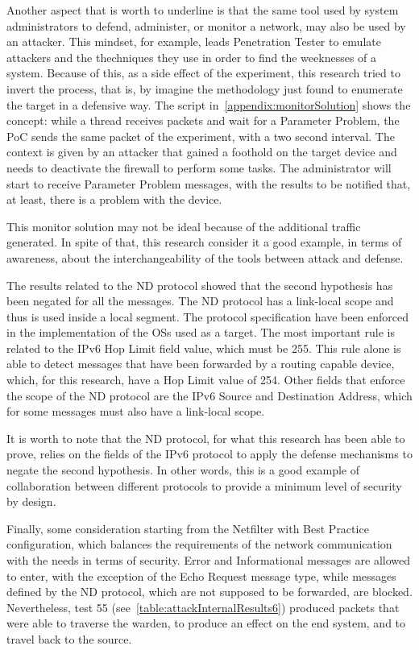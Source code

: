 \documentclass[12pt]{article}
\begin{document}
Another aspect that is worth to underline is that the same tool used by system administrators to defend, administer, or monitor a network, may also be used by an attacker. This mindset, for example, leads Penetration Tester to emulate attackers and the thechniques they use in order to find the weeknesses of a system. Because of this, as a side effect of the experiment, this research tried to invert the process, that is, by imagine the methodology just found to enumerate the target in a defensive way. The script in~\cref{appendix:monitorSolution} shows the concept: while a thread receives packets and wait for a Parameter Problem,  the PoC sends the same packet of the experiment, with a two second interval. The context is given by an attacker that gained a foothold on the target device and needs to deactivate the firewall to perform some tasks. The administrator will start to receive Parameter Problem messages, with the results to be notified that, at least, there is a problem with the device.

This monitor solution may not be ideal because of the additional traffic generated. In spite of that, this research consider it a good example, in terms of awareness, about the interchangeability of the tools between attack and defense.

The results related to the ND protocol showed that the second hypothesis has been negated for all the messages. The ND protocol has a link-local scope and thus is used inside a local segment. The protocol specification have been enforced in the implementation of the OSs used as a target. The most important rule is related to the IPv6 Hop Limit field value, which must be 255. This rule alone is able to detect messages that have been forwarded by a routing capable device, which, for this research, have a Hop Limit value of 254. Other fields that enforce the scope of the ND protocol are the IPv6 Source and Destination Address, which for some messages must also have a link-local scope.

It is worth to note that the ND protocol, for what this research has been able to prove, relies on the fields of the IPv6 protocol to apply the defense mechanisms to negate the second hypothesis. In other words, this is a good example of collaboration between different protocols to provide a minimum level of security by design.

Finally, some consideration starting from the Netfilter with Best Practice configuration, which balances the requirements of the network communication with the needs in terms of security. Error and Informational messages are allowed to enter, with the exception of the Echo Request message type, while messages defined by the ND protocol, which are not supposed to be forwarded, are blocked. Nevertheless, test 55 (see~\cref{table:attackInternalResults6}) produced packets that were able to traverse the warden, to produce an effect on the end system, and to travel back to the source.
\end{document}
